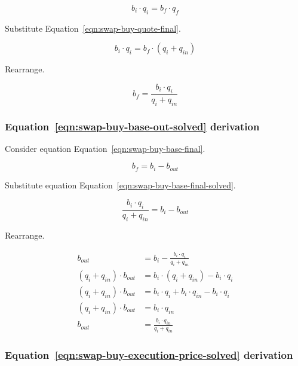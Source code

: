 \documentclass[table, twocolumn]{article}
\begin{document}
\begin{equation}
	b_i \cdot q_i = b_f \cdot q_f \nonumber
\end{equation}

Substitute Equation~\ref{eqn:swap-buy-quote-final}.

\begin{equation}
	b_i \cdot q_i = b_f \cdot (q_i + q_{in}) \nonumber
\end{equation}

Rearrange.

\begin{equation}
	b_f = \frac{b_i \cdot q_i}{q_i + q_{in}} \nonumber
\end{equation}

\subsubsection{Equation~\ref{eqn:swap-buy-base-out-solved} derivation}%
\label{sssec:equation-eqn-swap-buy-base-out-solved-derivation}

Consider equation Equation~\ref{eqn:swap-buy-base-final}.

\begin{equation}
	b_f = b_i - b_{out} \nonumber
\end{equation}

Substitute equation Equation~\ref{eqn:swap-buy-base-final-solved}.

\begin{equation}
	\frac{b_i \cdot q_i}{q_i + q_{in}} = b_i - b_{out} \nonumber
\end{equation}

Rearrange.

\begin{align}
	b_{out}                      & = b_i - \frac{b_i \cdot q_i}{q_i + q_{in}} \nonumber \\
	(q_i + q_{in}) \cdot b_{out} & = b_i \cdot (q_i + q_{in})- b_i \cdot q_i \nonumber  \\
	(q_i + q_{in}) \cdot b_{out} & =
	b_i \cdot q_i + b_i \cdot q_{in} - b_i \cdot q_i \nonumber                          \\
	(q_i + q_{in}) \cdot b_{out} & = b_i \cdot q_{in} \nonumber                         \\
	b_{out}                      & = \frac{b_i \cdot q_{in}}{q_i + q_{in}} \nonumber
\end{align}

\subsubsection{Equation~\ref{eqn:swap-buy-execution-price-solved} derivation}%
\label{sssec:equation-eqn-swap-buy-execution-price-solved-derivation}
\end{document}
